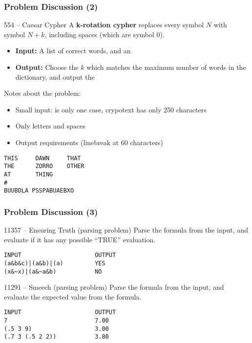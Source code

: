 \begin{frame}[fragile]
  \frametitle{Problem Discussion (2)}
  
  {\smaller
  \begin{exampleblock}{554 -- Caesar Cypher}
    A {\bf k-rotation cypher} replaces every symbol $N$ with symbol $N+k$,
    including spaces (which are symbol 0).
    \begin{itemize}
    \item {\bf Input:} A list of correct words, and an 
    \item {\bf Output:} Choose the $k$ which matches the maximum number of words in
      the dictionary, and output the 
    \end{itemize}

    \medskip
    
    Notes about the problem:
    \begin{itemize}
    \item Small input: is only one case, crypotext has only 250 characters
    \item Only letters and spaces
    \item Output requirements (linebreak at 60 characters)
    \end{itemize}
  \end{exampleblock}

\vfill
  
\begin{verbatim}
THIS     DAWN     THAT
THE      ZORRO    OTHER
AT       THING
#
BUUBDLA PSSPABUAEBXO
\end{verbatim}
  
  
  }
\end{frame}

\begin{frame}[fragile]
  \frametitle{Problem Discussion (3)}
  
  {\smaller
    \begin{exampleblock}{11357 -- Ensuring Truth (parsing problem)}
      Parse the formula from the input, and evaluate if
      it has any possible ``TRUE'' evaluation.
\begin{verbatim}
INPUT                     OUTPUT
(a&b&c)|(a&b)|(a)         YES
(x&~x)|(a&~a&b)           NO
\end{verbatim}
    \end{exampleblock}

    \begin{block}{11291 -- Smeech (parsing problem)}
      Parse the formula from the input, and evaluate the expected
      value from the formula.
\begin{verbatim}
INPUT                     OUTPUT
7                         7.00
(.5 3 9)                  3.00
(.7 3 (.5 2 2))           3.80
\end{verbatim}
    \end{block}
  }
\end{frame}


